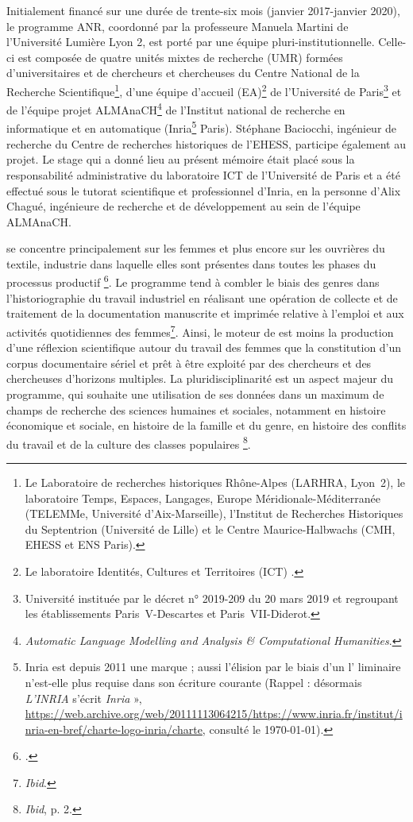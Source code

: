 Initialement financé sur une durée de trente-six mois (janvier 2017-janvier 2020), le programme ANR, coordonné par la professeure Manuela Martini de l'Université Lumière Lyon 2, est porté par une équipe pluri-institutionnelle.  Celle-ci est composée de quatre unités mixtes de recherche (UMR) formées d'universitaires et de chercheurs et chercheuses du Centre National de la Recherche Scientifique\footnote{Le Laboratoire de recherches historiques Rhône-Alpes (LARHRA, Lyon~2), le laboratoire Temps, Espaces, Langages, Europe Méridionale-Méditerranée (TELEMMe, Université d'Aix-Marseille), l'Institut de Recherches Historiques du Septentrion (Université de Lille) et le Centre Maurice-Halbwachs (CMH, EHESS et ENS Paris).}, d'une équipe d'accueil (EA)\footnote{Le laboratoire Identités, Cultures et Territoires (ICT) .} de l'Université de Paris\footnote{Université instituée par le décret n° 2019-209 du 20 mars 2019 et regroupant les établissements Paris~V-Descartes et Paris~VII-Diderot.} et de l'équipe projet ALMAnaCH\footnote{\textit{Automatic Language Modelling and Analysis \& Computational Humanities}.} de l'Institut national de recherche en informatique et en automatique (Inria\footnote{\og Inria \fg{} est depuis 2011 une marque ; aussi l'élision par le biais d'un \og l' \fg{} liminaire n'est-elle plus requise dans son écriture courante (\og Rappel : désormais \textit{L'INRIA} s'écrit \textit{Inria }», \url{https://web.archive.org/web/20111113064215/https://www.inria.fr/institut/inria-en-bref/charte-logo-inria/charte}, consulté le \today).} Paris). Stéphane Baciocchi, ingénieur de recherche du Centre de recherches historiques de l'EHESS, participe également au projet. Le stage qui a donné lieu au présent mémoire était placé sous la responsabilité administrative du laboratoire ICT  de l'Université de Paris et a été effectué sous le tutorat scientifique et professionnel d'Inria, en la personne d'Alix Chagué, ingénieure de recherche et de développement au sein de l'équipe ALMAnaCH.

\timeus{} se concentre principalement sur les femmes et plus encore sur les ouvrières du textile, industrie dans laquelle \og elles sont présentes dans toutes les phases du processus productif \fg{}\footnote{\cite[p. 1]{inria}.}. Le programme tend à combler le biais des genres dans l'historiographie du travail industriel en réalisant une opération de collecte et de traitement de la documentation manuscrite et imprimée relative à l'emploi et aux activités quotidiennes des femmes\footnote{\textit{Ibid}.}.  Ainsi, le moteur de \timeus{} est moins la production d'une réflexion scientifique autour du travail des femmes que la constitution d'un corpus documentaire sériel et prêt à être exploité par des chercheurs et des chercheuses d'horizons multiples. La pluridisciplinarité est un aspect majeur du programme, qui souhaite une utilisation de ses données dans un maximum de champs de recherche des sciences humaines et sociales, notamment \og en  histoire économique et sociale, en histoire de la famille et du genre, en histoire des conflits du travail et de la culture des classes populaires \fg{}\footnote{\textit{Ibid}, p. 2.}.

